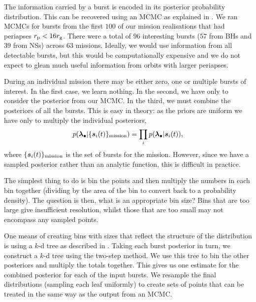 The information carried by a burst is encoded in its posterior probability distribution. This can be recovered using an MCMC as explained in . We ran MCMCs for bursts from the first $100$ of our mission realisations that had periapses $r_\mathrm{p} < 16 r_\mathrm{g}$. There were a total of $96$ interesting bursts ($57$ from BHs and $39$ from NSs) across $63$ missions. %
Ideally, we would use information from all detectable bursts, but this would be computationally expensive and we do not expect to glean much useful information from orbits with larger periapses.

During an individual mission there may be either zero, one or multiple bursts of interest. In the first case, we learn nothing. In the second, we have only to consider the posterior from our MCMC. In the third, we must combine the posteriors of all the bursts. This is easy in theory: as the priors are uniform we have only to multiply the individual posteriors,
\begin{equation}
p(\boldsymbol{\lambda}_\bullet|\{\boldsymbol{s}_i(t)\}_\mathrm{mission}) = \prod_i p(\boldsymbol{\lambda}_\bullet|\boldsymbol{s}_i(t)),
\end{equation}
where $\{\boldsymbol{s}_i(t)\}_\mathrm{mission}$ is the set of bursts for the mission. However, since we have a sampled posterior rather than an analytic function, this is difficult in practice.

The simplest thing to do is bin the points and then multiply the numbers in each bin together (dividing by the area of the bin to convert back to a probability density). The question is then, what is an appropriate bin size? Bins that are too large give insufficient resolution, whilst those that are too small may not encompass any sampled points.

One means of creating bins with sizes that reflect the structure of the distribution is using a $k$-d tree as described in . Taking each burst posterior in turn, we construct a $k$-d tree using the two-step method. We use this tree to bin the other posteriors and multiply the totals together. This gives us one estimate for the combined posterior for each of the input bursts. We resample the final distributions (sampling each leaf uniformly) to create sets of points that can be treated in the same way as the output from an MCMC.

